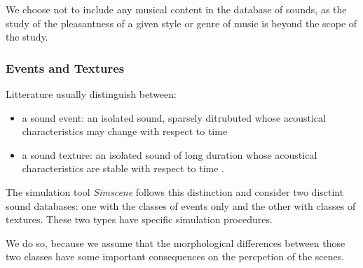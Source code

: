 \documentclass[twoside,twocolumn]{article}
\begin{document}

We choose not to include any musical content in the database of sounds, as the study of the pleasantness of a given style or genre of music is beyond the scope of the study.

\subsubsection*{Events and Textures}


Litterature usually distinguish between:
\begin{itemize}
\item {a sound event}: an isolated sound, sparsely ditrubuted whose acoustical characteristics may change with respect to time
\item {a sound texture}: an isolated sound of long duration whose acoustical characteristics are stable with respect to time \cite{saint1995classification}.
\end{itemize}

The simulation tool \emph{Simscene} follows this distinction and consider two disctint sound databases: one with the classes of events only and the other with classes of textures. These two types have specific simulation procedures.%


We do so, because we assume that the morphological differences between those two classes have some important consequences on the percpetion of the scenes.
\end{document}
